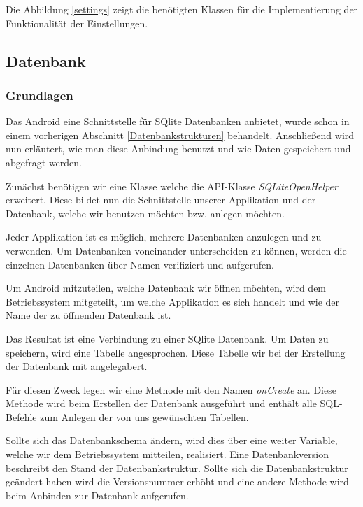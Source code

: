 Die Abbildung \ref{settings} zeigt die benötigten Klassen für die Implementierung der Funktionalität der Einstellungen.

\subsection{Datenbank}

\subsubsection{Grundlagen}

Das Android eine Schnittstelle für SQlite Datenbanken anbietet, wurde schon in einem vorherigen Abschnitt \ref{Datenbankstrukturen} behandelt. Anschließend wird nun erläutert, wie man diese Anbindung benutzt und wie Daten gespeichert und abgefragt werden.

Zunächst benötigen wir eine Klasse welche die API-Klasse \textit{SQLiteOpenHelper} erweitert. Diese bildet nun die Schnittstelle unserer Applikation und der Datenbank, welche wir benutzen möchten bzw. anlegen möchten.

Jeder Applikation ist es möglich, mehrere Datenbanken anzulegen und zu verwenden. Um Datenbanken voneinander unterscheiden zu können, werden die einzelnen Datenbanken über Namen verifiziert und aufgerufen.

Um Android mitzuteilen, welche Datenbank wir öffnen möchten, wird dem Betriebssystem mitgeteilt, um welche Applikation es sich handelt und wie der Name der zu öffnenden Datenbank ist.

Das Resultat ist eine Verbindung zu einer SQlite Datenbank. Um Daten zu speichern, wird eine Tabelle angesprochen. Diese Tabelle wir bei der Erstellung der Datenbank mit angelegabert.

Für diesen Zweck legen wir eine Methode mit den Namen \textit{onCreate} an. Diese Methode wird beim Erstellen der Datenbank ausgeführt und enthält alle SQL-Befehle zum Anlegen der von uns gewünschten Tabellen.

Sollte sich das Datenbankschema ändern, wird dies über eine weiter Variable, welche wir dem Betriebssystem mitteilen, realisiert. Eine Datenbankversion beschreibt den Stand der Datenbankstruktur. Sollte sich die Datenbankstruktur geändert haben wird die Versionsnummer erhöht und eine andere Methode wird beim Anbinden zur Datenbank aufgerufen.

